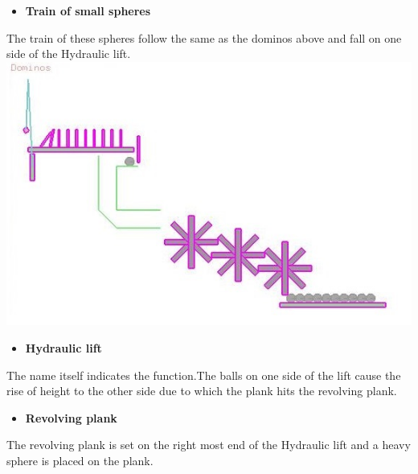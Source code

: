 \documentclass{article}
\begin{document}
\begin{itemize}
        \begin{itemize}[label=$\blacksquare$] \vspace{0cm}
            \item \textbf{\Large Train of small spheres } 
        \end{itemize}
        \large The train of these spheres follow the same as the dominos above and fall on one side of the Hydraulic lift.\\ \vspace{0.65 cm}
        \includegraphics[width=1 \linewidth]{avinash.jpg}\\

        \begin{itemize}[label=$\blacksquare$] \vspace{0cm}
            \item \textbf{\Large Hydraulic lift } 
        \end{itemize}
        \large The name itself indicates the function.The balls on one side of the lift cause the rise of height to the other side due to which the plank hits the revolving plank. \\ \vspace{0.65 cm}

        \begin{itemize}[label=$\blacksquare$] \vspace{0cm}
            \item \textbf{\Large Revolving plank } 
        \end{itemize}
        \large The revolving plank is set on the right most end of the Hydraulic lift and a heavy sphere is placed on the plank.\\ \vspace{0.65 cm}


\end{itemize}
\end{document}
